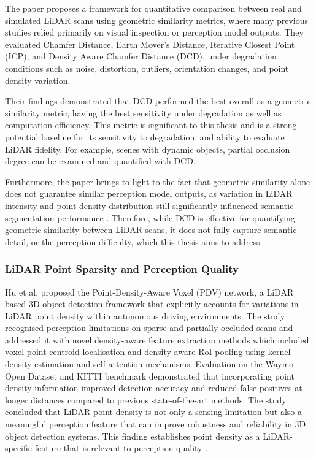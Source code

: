 \documentclass[12pt,a4paper]{article}
\begin{document}
The paper proposes a framework for quantitative comparison between real
and simulated LiDAR scans using geometric similarity metrics, where many
previous studies relied primarily on visual inspection or perception
model outputs. They evaluated Chamfer Distance, Earth Mover's Distance,
Iterative Closest Point (ICP), and Density Aware Chamfer Distance (DCD),
under degradation conditions such as noise, distortion, outliers,
orientation changes, and point density variation.

Their findings demonstrated that DCD performed the best overall as a
geometric similarity metric, having the best sensitivity under
degradation as well as computation efficiency. This metric is
significant to this thesis and is a strong potential baseline for its
sensitivity to degradation, and ability to evaluate LiDAR fidelity. For
example, scenes with dynamic objects, partial occlusion degree can be
examined and quantified with DCD.

Furthermore, the paper brings to light to the fact that geometric
similarity alone does not guarantee similar perception model outputs, as
variation in LiDAR intensity and point density distribution still
significantly influenced semantic segmentation performance
\cite{bib_ref_4}. Therefore, while DCD is effective for
quantifying geometric similarity between LiDAR scans, it does not fully
capture semantic detail, or the perception difficulty, which this thesis
aims to address.

\subsubsection{LiDAR Point Sparsity and Perception Quality}

Hu et al. proposed the Point-Density-Aware Voxel (PDV) network, a LiDAR
based 3D object detection framework that explicitly accounts for
variations in LiDAR point density within autonomous driving
environments. The study recognised perception limitations on sparse and
partially occluded scans and addressed it with novel density-aware
feature extraction methods which included voxel point centroid
localisation and density-aware RoI pooling using kernel density
estimation and self-attention mechanisms. Evaluation on the Waymo Open
Dataset and KITTI benchmark demonstrated that incorporating point
density information improved detection accuracy and reduced false
positives at longer distances compared to previous state-of-the-art
methods. The study concluded that LiDAR point density is not only a
sensing limitation but also a meaningful perception feature that can
improve robustness and reliability in 3D object detection systems.
This finding establishes point density as a LiDAR-specific feature that is relevant to perception quality \cite{bib_ref_10}.
\end{document}
